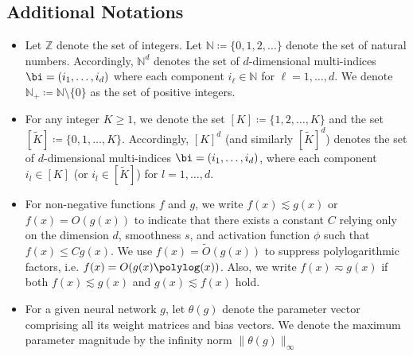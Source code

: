 \documentclass[11pt]{article}
\begin{document}
\subsection{Additional Notations}
\begin{itemize}
    \item Let $\mathbb{Z}$ denote the set of integers. Let $\mathbb{N} \coloneqq  \{0, 1, 2, \dots\}$ denote the set of natural numbers. Accordingly, $\mathbb{N}^d$ denotes the set of $d$-dimensional multi-indices $\bi=(i_1, \dots, i_d)$ where each component $i_\ell \in \mathbb{N}$ for $\ell=1, \dots,d$.
    We denote $\mathbb{N}_+ \coloneqq \mathbb{N} \setminus \{0\}$ as the set of positive integers.
    \item For any integer \( K \geq 1 \), we denote the set \( [K] \coloneqq  \{1, 2, \dots, K\} \) and the set \( [\tilde{K}] \coloneqq  \{0, 1, \dots, K\} \). Accordingly, \( [K]^d \) (and similarly \( [\tilde{K}]^d \)) denotes the set of \( d \)-dimensional multi-indices \( \bi = (i_1, \dots, i_d) \), where each component \( i_l \in [K] \) (or \( i_l \in [\tilde{K}] \)) for \( l = 1, \dots, d \).
    
    
    \item For non-negative functions $f$ and $g$, we write $f(x) \lesssim g(x)$ or $f(x) = O(g(x))$ to indicate that there exists a constant $C$ relying only on the dimension $d$, smoothness $s$, and activation function $\phi$ such that $f(x) \leq C g(x)$. We use $f(x) = \tilde{O}(g(x))$ to suppress polylogarithmic factors, i.e. $f(x) = O(g(x)\polylog(x))$. Also, we write $f(x)\eqsim g(x)$ if both $f(x)\lesssim g(x)$ and $g(x)\lesssim f(x)$ hold.
    \item For a given neural network $g$, let $\theta(g)$ denote the parameter vector comprising all its weight matrices and bias vectors.  We denote the maximum parameter magnitude by the infinity norm $\|\theta(g)\|_\infty$
    

\end{itemize}
\end{document}
